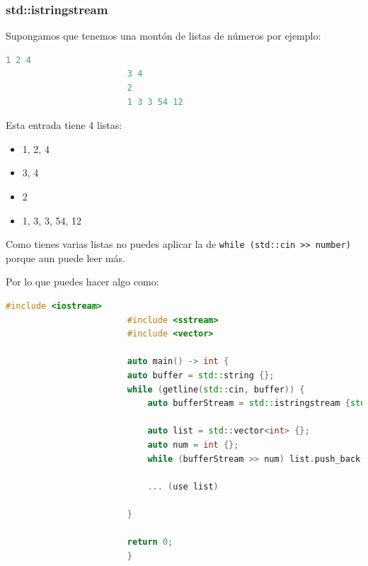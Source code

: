 \documentclass[12pt, fleqn]{report}                             %
\theoremstyle{break}                                            %
\newcommand{\textCode}[1]  { \texttt{#1} }                      %
\begin{document}
                \subsubsection{std::istringstream}
                    
                    Supongamos que tenemos una montón de listas de números
                    por ejemplo:
                    \begin{lstlisting}[language=C++, gobble=24]
                        1 2 4
                        3 4
                        2
                        1 3 3 54 12
                    \end{lstlisting}

                    Esta entrada tiene 4 listas:
                    \begin{itemize}
                        \item 1, 2, 4
                        \item 3, 4
                        \item 2
                        \item 1, 3, 3, 54, 12
                    \end{itemize}

                    Como tienes varias listas no puedes aplicar la de
                    \textCode{while (std::cin >\/> \; number) } porque aun puede leer más.

                    Por lo que puedes hacer algo como:
                    \begin{lstlisting}[language=C++, gobble=24]
                        #include <iostream>
                        #include <sstream>
                        #include <vector>

                        auto main() -> int {
                        auto buffer = std::string {};
                        while (getline(std::cin, buffer)) {
                            auto bufferStream = std::istringstream {std::move(buffer)};
                            
                            auto list = std::vector<int> {};
                            auto num = int {};
                            while (bufferStream >> num) list.push_back(num);

                            ... (use list)

                        }
                        
                        return 0;
                        }
                    \end{lstlisting}
\end{document}
